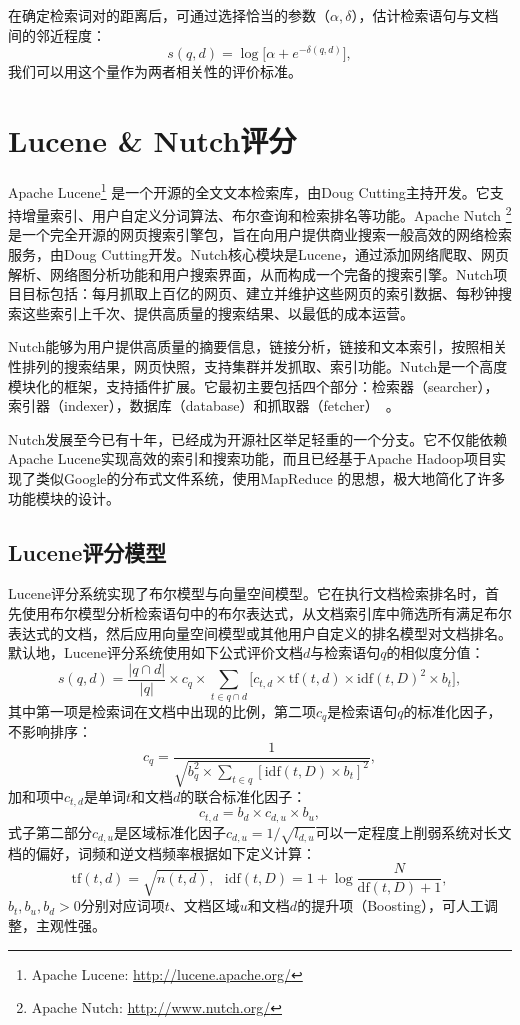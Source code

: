 在确定检索词对的距离后，可通过选择恰当的参数（$\alpha,\delta$），估计检索语句与文档间的邻近程度：
\[
    s(q,d)=\log\big[\alpha + e^{-\delta(q,d)}\big],
\]
我们可以用这个量作为两者相关性的评价标准。

\chapter{Lucene \& Nutch评分}
Apache Lucene\footnote{Apache Lucene: \href{http://lucene.apache.org/}{http://lucene.apache.org/}}
是一个开源的全文文本检索库，由Doug Cutting主持开发。它支持增量索引、用户自定义分词算法、布尔查询和检索排名等功能。Apache Nutch
\footnote{Apache Nutch: \href{http://www.nutch.org/}{http://www.nutch.org/}}
是一个完全开源的网页搜索引擎包，旨在向用户提供商业搜索一般高效的网络检索服务\cite{khare2004nutch}，由Doug Cutting开发。Nutch核心模块是Lucene，通过添加网络爬取、网页解析、网络图分析功能和用户搜索界面，从而构成一个完备的搜索引擎。Nutch项目目标包括：每月抓取上百亿的网页、建立并维护这些网页的索引数据、每秒钟搜索这些索引上千次、提供高质量的搜索结果、以最低的成本运营。

Nutch能够为用户提供高质量的摘要信息，链接分析，链接和文本索引，按照相关性排列的搜索结果，网页快照，支持集群并发抓取、索引功能。Nutch是一个高度模块化的框架，支持插件扩展。它最初主要包括四个部分：检索器（searcher），索引器（indexer），数据库（database）和抓取器（fetcher）~\cite{khare2004nutch}。

Nutch发展至今已有十年，已经成为开源社区举足轻重的一个分支。它不仅能依赖Apache Lucene实现高效的索引和搜索功能，而且已经基于Apache Hadoop项目实现了类似Google的分布式文件系统，使用MapReduce 的思想，极大地简化了许多功能模块的设计。

\section{Lucene评分模型}
Lucene评分系统实现了布尔模型与向量空间模型。它在执行文档检索排名时，首先使用布尔模型分析检索语句中的布尔表达式，从文档索引库中筛选所有满足布尔表达式的文档，然后应用向量空间模型或其他用户自定义的排名模型对文档排名。默认地，Lucene评分系统使用如下公式评价文档$d$与检索语句$q$的相似度分值：
\begin{equation}\label{eq:lucene-score}
    s(q,d)= \frac{|q\cap d|}{|q|} \times c_q \times \sum_{t \in q \cap d} \Big[c_{t,d} \times \mathrm{tf}(t,d) \times \mathrm{idf}(t,D)^2 \times b_t \Big],
\end{equation}
其中第一项是检索词在文档中出现的比例，第二项$c_q$是检索语句$q$的标准化因子，不影响排序：
\[
    c_q = \frac{1}{\sqrt{b_q^2 \times \sum\limits_{t \in q} [\mathrm{idf}(t,D) \times b_t]^2}},
\]
加和项中$c_{t,d}$是单词$t$和文档$d$的联合标准化因子：
\begin{equation}\label{eq:term-doc-norm}
    c_{t,d} = b_d \times c_{d,u} \times b_u,
\end{equation}
式子第二部分$c_{d,u}$是区域标准化因子$c_{d,u} = 1/\sqrt{l_{d,u}}$可以一定程度上削弱系统对长文档的偏好，词频和逆文档频率根据如下定义计算：
\[
    \mathrm{tf}(t,d) = \sqrt{n(t,d)}, ~~~ \mathrm{idf}(t,D) = 1 + \log \frac{N}{\mathrm{df}(t,D) + 1},
\]
$b_t, b_u, b_d>0$分别对应词项$t$、文档区域$u$和文档$d$的提升项（Boosting），可人工调整，主观性强。

